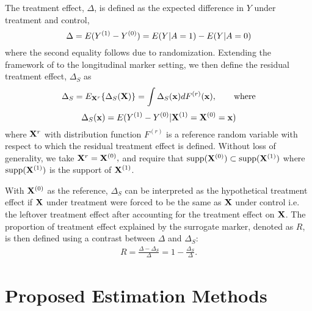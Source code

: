 \documentclass[useAMS,usenatbib,referee]{biom}
\begin{document}
The treatment effect, $\Delta$, is defined as the 
expected difference in \(Y\) under treatment and control,
\[\Delta=E(Y^{(1)}-Y^{(0)}) = E(Y|A=1)-E(Y|A=0)\]
where the second equality follows due to randomization. Extending the framework of \cite{parast2016robust} to the longitudinal marker setting, we then define the residual treatment effect, $\Delta_S$ as 
$$\Delta_S = E_{{\bf X}^{r}}\{\Delta_S({\bf X})\} = \int \Delta_S({\bf x}) dF^{(r)}({\bf x}), \quad \quad \mbox{where}$$
$$\Delta_S({\bf x}) = E(Y^{(1)}-Y^{(0)} | {\bf X}^{(1)} = {\bf X}^{(0)}={\bf x})$$
where ${\bf X}^{r}$ with distribution function $F^{(r)}$ is a reference random variable with respect to which the residual treatment effect is defined.  Without loss of generality, we take ${\bf X}^{r} = {\bf X} ^{(0)},$ and require that $\text{supp}({\bf X}^{(0)}) \subset \text{supp}({\bf X}^{(1)})$ where $\text{supp}({\bf X}^{(1)})$ is the support of ${\bf X}^{(1)}$. 

With ${\bf X}^{(0)}$ as the reference, $\Delta_S$ can be interpreted as the hypothetical treatment effect if ${\bf X}$ under treatment were forced to be the same as ${\bf X}$ under control i.e. the leftover treatment effect after accounting for the treatment effect on ${\bf X}$. The proportion of treatment effect explained by the surrogate marker, denoted as $R$, is then defined using a contrast between $\Delta$ and $\Delta_S$:
\begin{align}
    R = \frac{\Delta - \Delta_S}{\Delta} = 1 - \frac{\Delta_S}{\Delta}.
\end{align}

\section{Proposed Estimation Methods}\label{sec:2}
\end{document}
